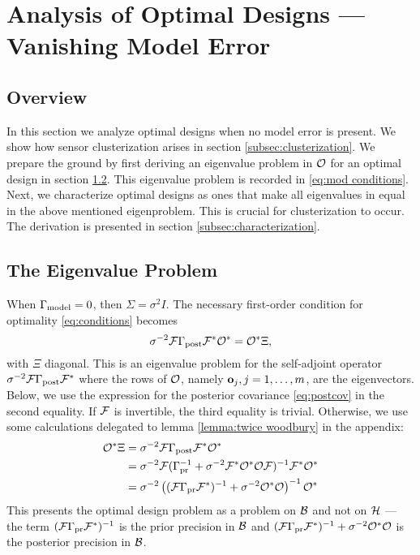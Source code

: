 \documentclass{amsart}
\numberwithin{equation}{section}
\begin{document}
\section{Analysis of Optimal Designs --- Vanishing Model Error}\label{section:vanishing}
\subsection{Overview}
In this section we analyze optimal designs when no model error is
present. We show how sensor clusterization arises in section
\ref{subsec:clusterization}. We prepare the ground by first deriving
an eigenvalue problem in $\mathcal{O}$ for an optimal design in section
\ref{subsec:eigenproblem}. This eigenvalue problem is recorded in
\eqref{eq:mod conditions}. Next, we characterize optimal designs as
ones that make all eigenvalues in equal in the above mentioned
eigenproblem. This is crucial for clusterization to occur. The
derivation is presented in section \ref{subsec:characterization}.


\subsection{The Eigenvalue Problem}\label{subsec:eigenproblem}
When $\Gamma_{\textup{model}} = 0$, then $\Sigma= \sigma^2I$. The necessary
first-order condition for optimality \eqref{eq:conditions} becomes
\begin{equation}\label{eq:eigenproblem}
  \sigma^{-2}\mathcal{F} \Gamma_{\textup{post}} \mathcal{F}^* \mathcal{O}^* = \mathcal{O}^* \Xi, 
\end{equation}
with $\Xi$ diagonal. This is an eigenvalue problem for the
self-adjoint operator $\sigma^{-2}\mathcal{F} \Gamma_{\textup{post}} \mathcal{F}^*$ where the rows
of $\mathcal{O}$, namely $\mathbf{o}_j,j=1,\dots, m$, are the eigenvectors. Below,
we use the expression for the posterior covariance \eqref{eq:postcov}
in the second equality. If $\mathcal{F}$ is invertible, the third equality is
trivial. Otherwise, we use some calculations delegated to lemma
\ref{lemma:twice woodbury} in the appendix:
\begin{align}\label{eq:mod conditions}
  \begin{split}
  \mathcal{O}^* \Xi &= \sigma^{-2}\mathcal{F} \Gamma_{\textup{post}} \mathcal{F}^* \mathcal{O}^*  \\
  &= \sigma^{-2} \mathcal{F}( \Gamma_{\textup{pr}}^{-1} + \sigma^{-2}  \mathcal{F}^* \mathcal{O}^* \mathcal{O} \mathcal{F} )^{-1} \mathcal{F}^* \mathcal{O}^* \\
  &= \sigma^{-2} \left ( (\mathcal{F}\Gamma_{\textup{pr}}\mathcal{F}^*)^{-1} + \sigma^{-2}  \mathcal{O}^* \mathcal{O} \right )^{-1} \mathcal{O}^*
  \end{split}
\end{align}  
This presents the optimal design problem as a problem on $\mathcal{B}$ and
not on $\mathcal{H}$ --- the term $(\mathcal{F} \Gamma_{\textup{pr}} \mathcal{F}^*)^{-1}$ is the prior
precision in $\mathcal{B}$ and $(\mathcal{F}\Gamma_{\textup{pr}}\mathcal{F}^*)^{-1} + \sigma^{-2} \mathcal{O}^*
\mathcal{O}$ is the posterior precision in $\mathcal{B}$.
\end{document}
